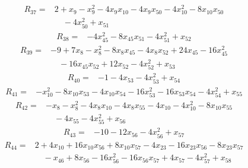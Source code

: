 \begin{equation*}\begin{split}
R_{37}={}&2 + x_{9} - x_{9}^{2} - 4x_{9} x_{10} - 4x_{9} x_{50} - 4x_{10}^{2} - 8x_{10} x_{50}\\
&\quad -4x_{50}^{2} + x_{51}
\end{split}\end{equation*}
\begin{equation*}\begin{split}
R_{38}={}&-4x_{45}^{2} - 8x_{45} x_{51} - 4x_{51}^{2} + x_{52}
\end{split}\end{equation*}
\begin{equation*}\begin{split}
R_{39}={}&-9 + 7x_{8} - x_{8}^{2} - 8x_{8} x_{45} - 4x_{8} x_{52} + 24x_{45} - 16x_{45}^{2}\\
&\quad -16x_{45} x_{52} + 12x_{52} - 4x_{52}^{2} + x_{53}
\end{split}\end{equation*}
\begin{equation*}\begin{split}
R_{40}={}&-1 - 4x_{53} - 4x_{53}^{2} + x_{54}
\end{split}\end{equation*}
\begin{equation*}\begin{split}
R_{41}={}&-x_{10}^{2} - 8x_{10} x_{53} - 4x_{10} x_{54} - 16x_{53}^{2} - 16x_{53} x_{54} - 4x_{54}^{2} + x_{55}
\end{split}\end{equation*}
\begin{equation*}\begin{split}
R_{42}={}&-x_{8} - x_{8}^{2} - 4x_{8} x_{10} - 4x_{8} x_{55} - 4x_{10} - 4x_{10}^{2} - 8x_{10} x_{55}\\
&\quad -4x_{55} - 4x_{55}^{2} + x_{56}
\end{split}\end{equation*}
\begin{equation*}\begin{split}
R_{43}={}&-10 - 12x_{56} - 4x_{56}^{2} + x_{57}
\end{split}\end{equation*}
\begin{equation*}\begin{split}
R_{44}={}&2 + 4x_{10} + 16x_{10} x_{56} + 8x_{10} x_{57} - 4x_{23} - 16x_{23} x_{56} - 8x_{23} x_{57}\\
&\quad -x_{46} + 8x_{56} - 16x_{56}^{2} - 16x_{56} x_{57} + 4x_{57} - 4x_{57}^{2} + x_{58}
\end{split}\end{equation*}
